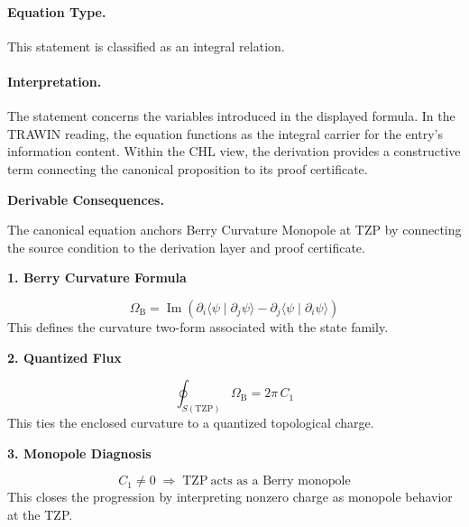 \paragraph{Equation Type.}
This statement is classified as an integral relation.

\paragraph{Interpretation.}
The statement concerns the variables introduced in the displayed formula. In the TRAWIN reading, the equation functions as the integral carrier for the entry’s information content. Within the CHL view, the derivation provides a constructive term connecting the canonical proposition to its proof certificate.

\par\vspace{0.35em}
\noindent\textbf{Derivable Consequences.}\quad
\begingroup
\footnotesize
\raggedright
The canonical equation anchors Berry Curvature Monopole at TZP by connecting the source condition to the derivation layer and proof certificate.
\par\endgroup

\noindent\textbf{1. Berry Curvature Formula}\par
\[
\Omega_{\mathrm{B}}
=
\operatorname{Im}\!\left(
\partial_i\langle\psi\mid \partial_j\psi\rangle
-\partial_j\langle\psi\mid \partial_i\psi\rangle
\right)
\]
\noindent This defines the curvature two-form associated with the state family.\par
\noindent\textbf{2. Quantized Flux}\par
\[
\oint_{S(\mathrm{TZP})}\Omega_{\mathrm{B}}=2\pi\,C_1
\]
\noindent This ties the enclosed curvature to a quantized topological charge.\par
\noindent\textbf{3. Monopole Diagnosis}\par
\[
C_1\neq 0
\;\Longrightarrow\;
\mathrm{TZP}\ \text{acts as a Berry monopole}
\]
\noindent This closes the progression by interpreting nonzero charge as monopole behavior at the TZP.\par

